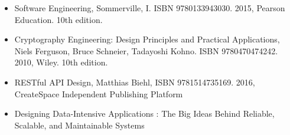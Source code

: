 \begin{itemize}
    \item Software Engineering, Sommerville, I. ISBN 9780133943030. 2015, Pearson Education. 10th edition.
    \item Cryptography Engineering: Design Principles and Practical Applications, Niels Ferguson, Bruce Schneier, Tadayoshi Kohno. ISBN 9780470474242. 2010, Wiley. 10th edition.
    \item RESTful API Design, Matthias Biehl, ISBN 9781514735169. 2016, CreateSpace Independent Publishing Platform
    \item Designing Data-Intensive Applications : The Big Ideas Behind Reliable, Scalable, and Maintainable Systems
\end{itemize}
